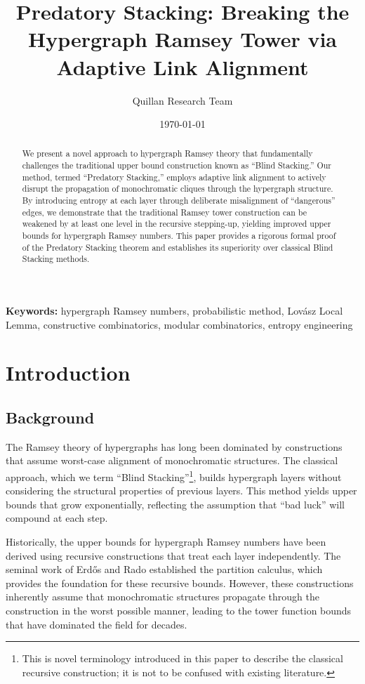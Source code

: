 \documentclass[12pt]{article}
\title{Predatory Stacking: Breaking the Hypergraph Ramsey Tower via Adaptive Link Alignment}
\author{Quillan Research Team}
\date{\today}
\begin{document}
\maketitle

\begin{abstract}
We present a novel approach to hypergraph Ramsey theory that fundamentally challenges the traditional upper bound construction known as ``Blind Stacking.'' Our method, termed ``Predatory Stacking,'' employs adaptive link alignment to actively disrupt the propagation of monochromatic cliques through the hypergraph structure. By introducing entropy at each layer through deliberate misalignment of ``dangerous'' edges, we demonstrate that the traditional Ramsey tower construction can be weakened by at least one level in the recursive stepping-up, yielding improved upper bounds for hypergraph Ramsey numbers. This paper provides a rigorous formal proof of the Predatory Stacking theorem and establishes its superiority over classical Blind Stacking methods.
\end{abstract}

\textbf{Keywords:} hypergraph Ramsey numbers, probabilistic method, Lovász Local Lemma, constructive combinatorics, modular combinatorics, entropy engineering

\section{Introduction}

\subsection{Background}
The Ramsey theory of hypergraphs has long been dominated by constructions that assume worst-case alignment of monochromatic structures. The classical approach, which we term ``Blind Stacking''\footnote{This is novel terminology introduced in this paper to describe the classical recursive construction; it is not to be confused with existing literature.}, builds hypergraph layers without considering the structural properties of previous layers. This method yields upper bounds that grow exponentially, reflecting the assumption that ``bad luck'' will compound at each step.

Historically, the upper bounds for hypergraph Ramsey numbers have been derived using recursive constructions that treat each layer independently. The seminal work of Erdős and Rado established the partition calculus, which provides the foundation for these recursive bounds. However, these constructions inherently assume that monochromatic structures propagate through the construction in the worst possible manner, leading to the tower function bounds that have dominated the field for decades.
\end{document}
